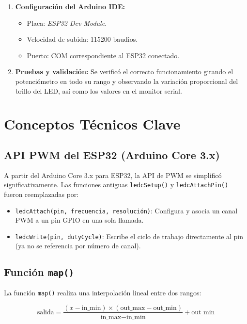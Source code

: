 \documentclass[12pt,a4paper]{article}
\begin{document}
\begin{enumerate}
    \item \textbf{Configuración del Arduino IDE:}
    \begin{itemize}
        \item Placa: \textit{ESP32 Dev Module}.
        \item Velocidad de subida: 115200 baudios.
        \item Puerto: COM correspondiente al ESP32 conectado.
    \end{itemize}
    
    \item \textbf{Pruebas y validación:} Se verificó el correcto funcionamiento girando el potenciómetro en todo su rango y observando la variación proporcional del brillo del LED, así como los valores en el monitor serial.
\end{enumerate}

\section{Conceptos Técnicos Clave}

\subsection{API PWM del ESP32 (Arduino Core 3.x)}

A partir del Arduino Core 3.x para ESP32, la API de PWM se simplificó significativamente. Las funciones antiguas \texttt{ledcSetup()} y \texttt{ledcAttachPin()} fueron reemplazadas por:

\begin{itemize}
    \item \texttt{ledcAttach(pin, frecuencia, resolución)}: Configura y asocia un canal PWM a un pin GPIO en una sola llamada.
    \item \texttt{ledcWrite(pin, dutyCycle)}: Escribe el ciclo de trabajo directamente al pin (ya no se referencia por número de canal).
\end{itemize}

\subsection{Función \texttt{map()}}

La función \texttt{map()} realiza una interpolación lineal entre dos rangos:

\begin{equation}
\text{salida} = \frac{(x - \text{in\_min}) \times (\text{out\_max} - \text{out\_min})}{\text{in\_max} - \text{in\_min}} + \text{out\_min}
\label{eq:map}
\end{equation}
\end{document}

